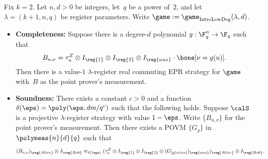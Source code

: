 \begin{theorem}\label{thm:big-planes-low-degree}
Fix $k = 2$.
Let $n, d>0$ be integers, let~$q$ be a power of~$2$,
and let $\lambda = (k+1, n, q)$ be register parameters.
Write $\game := \game_{\mathrm{IntroLowDeg}}(\lambda, d)$.
\begin{itemize}
\item[$\circ$] \textbf{Completeness:}
		Suppose there is a degree-$d$ polynomial $g:\F_q^{n}\rightarrow \F_q$ such that
		\begin{equation*}
			B_{u, \nu} = \tau_u^Z \otimes I_{\reg{1}} \otimes I_{\reg{2}} \otimes I_{\reg{aux}} \cdot \bone[\nu = g(u)].
		\end{equation*}
		Then there is a value-$1$ $\lambda$-register real
                commuting EPR strategy for $\game$ with~$B$ as the point prover's measurement.
\item[$\circ$] \textbf{Soundness:}
		There exists a constant $c > 0$ and a function $\delta(\eps) = \poly(\eps, dm/q^c)$ such that the following holds.
		Suppose $\calS$ is a projective $\lambda$-register strategy with value $1-\eps$.
		Write $\{B_{u, \nu}\}$ for the point prover's measurement.
		Then there exists a POVM $\{G_g\}$
                in~$\polymeas{n}{d}{q}$ such that
		\begin{equation*}
			(B_{u, \nu})_{\reg{Alice}} \otimes I_{\reg{Bob}}
				\approx_{\delta(\eps)} (\tau^Z_{u}\otimes I_{\reg{1}} \otimes I_{\reg{2}}
					\otimes (G_{[g(u) = \nu]})_{\reg{aux}})_{\reg{Alice}} \otimes I_{\reg{Bob}}.
		\end{equation*}
\end{itemize}
\end{theorem}

